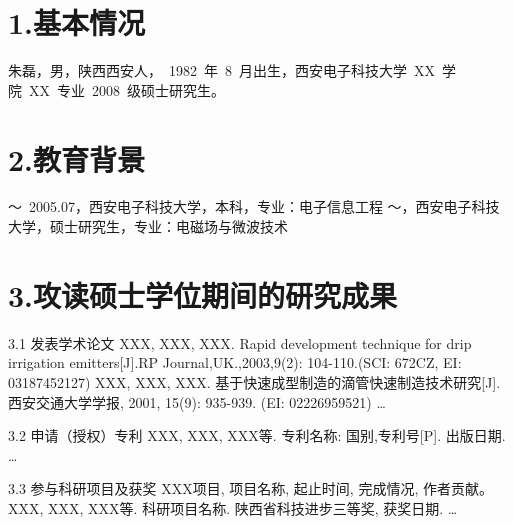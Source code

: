 
\begin{resume}

\section*{1.\hspace{0.75em}基本情况}
朱磊，男，陕西西安人，~1982~年~8~月出生，西安电子科技大学~XX~学院~XX~专业~2008~级硕士研究生。
\section*{2.\hspace{0.75em}教育背景}
\begin{resumelist*}
～~2005.07，西安电子科技大学，本科，专业：电子信息工程
～\hspace{3.5em}，西安电子科技大学，硕士研究生，专业：电磁场与微波技术
\end{resumelist*}

\section*{3.\hspace{0.75em}攻读硕士学位期间的研究成果}
\begin{resumelist}{\hspace{-0.25em}3.1\hspace{0.5em} 发表学术论文}
\resumelistitem XXX, XXX, XXX. Rapid development technique for drip irrigation emitters[J].RP Journal,UK.,2003,9(2): 104-110.(SCI: 672CZ, EI: 03187452127)
\resumelistitem XXX, XXX, XXX. 基于快速成型制造的滴管快速制造技术研究[J]. 西安交通大学学报, 2001, 15(9): 935-939. (EI: 02226959521)
\resumelistitem \ldots
\end{resumelist}

\begin{resumelist}{\hspace{-0.25em}3.2\hspace{0.5em} 申请（授权）专利}
\resumelistitem XXX, XXX, XXX等. 专利名称: 国别,专利号[P]. 出版日期.
\resumelistitem \ldots
\end{resumelist}

\begin{resumelist}{\hspace{-0.25em}3.3\hspace{0.5em} 参与科研项目及获奖}
\resumelistitem XXX项目, 项目名称, 起止时间, 完成情况, 作者贡献。
\resumelistitem XXX, XXX, XXX等. 科研项目名称. 陕西省科技进步三等奖, 获奖日期.
\resumelistitem \ldots
\end{resumelist}
\end{resume}
